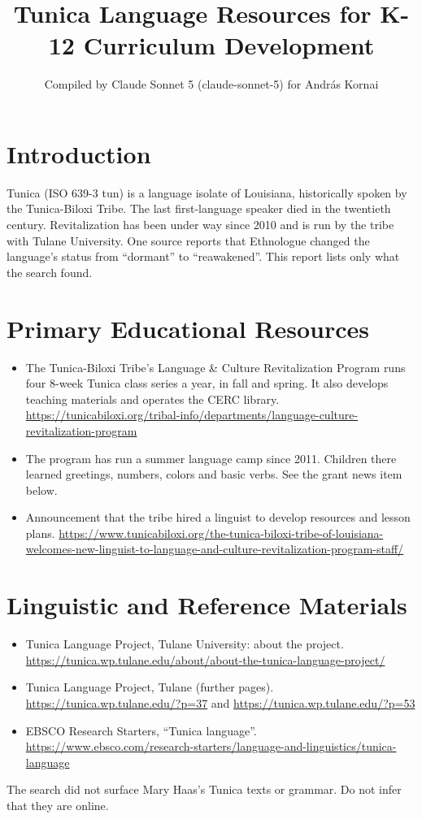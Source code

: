 \documentclass[12pt]{article}
\title{Tunica Language Resources for K-12 Curriculum Development}
\author{Compiled by Claude Sonnet 5 (claude-sonnet-5) for Andr\'as Kornai}
\date{}
\begin{document}
\maketitle

\section{Introduction}
Tunica (ISO 639-3 tun) is a language isolate of Louisiana, historically spoken by the Tunica-Biloxi Tribe. The last first-language speaker died in the twentieth century. Revitalization has been under way since 2010 and is run by the tribe with Tulane University. One source reports that Ethnologue changed the language's status from ``dormant'' to ``reawakened''. This report lists only what the search found.

\section{Primary Educational Resources}
\begin{itemize}
\item The Tunica-Biloxi Tribe's Language \& Culture Revitalization Program runs four 8-week Tunica class series a year, in fall and spring. It also develops teaching materials and operates the CERC library. \url{https://tunicabiloxi.org/tribal-info/departments/language-culture-revitalization-program}
\item The program has run a summer language camp since 2011. Children there learned greetings, numbers, colors and basic verbs. See the grant news item below.
\item Announcement that the tribe hired a linguist to develop resources and lesson plans. \url{https://www.tunicabiloxi.org/the-tunica-biloxi-tribe-of-louisiana-welcomes-new-linguist-to-language-and-culture-revitalization-program-staff/}
\end{itemize}

\section{Linguistic and Reference Materials}
\begin{itemize}
\item Tunica Language Project, Tulane University: about the project. \url{https://tunica.wp.tulane.edu/about/about-the-tunica-language-project/}
\item Tunica Language Project, Tulane (further pages). \url{https://tunica.wp.tulane.edu/?p=37} and \url{https://tunica.wp.tulane.edu/?p=53}
\item EBSCO Research Starters, ``Tunica language''. \url{https://www.ebsco.com/research-starters/language-and-linguistics/tunica-language}
\end{itemize}
The search did not surface Mary Haas's Tunica texts or grammar. Do not infer that they are online.
\end{document}
